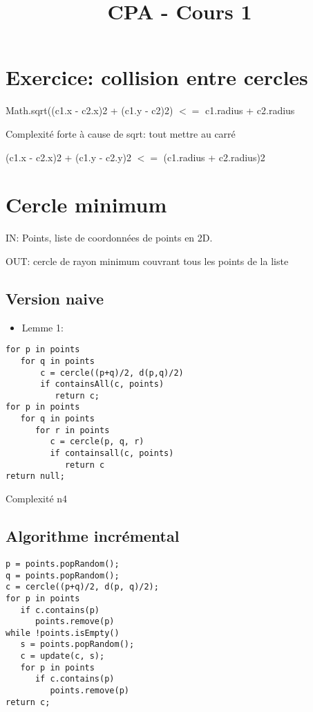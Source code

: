 \documentclass{article}
\begin{document}
\title{CPA - Cours 1}
\maketitle
\section{Exercice: collision entre cercles}
Math.sqrt((c1.x - c2.x)2 + (c1.y - c2)2) $<=$ c1.radius + c2.radius

Complexité forte à cause de sqrt: tout mettre au carré

(c1.x - c2.x)2 + (c1.y - c2.y)2 $<=$ (c1.radius + c2.radius)2
\section{Cercle minimum}
IN: Points, liste de coordonnées de points en 2D.

OUT: cercle de rayon minimum couvrant tous les points de la liste

\subsection{Version naive}
\begin{itemize}
\item Lemme 1: 
\end{itemize}
\begin{verbatim}
for p in points
   for q in points
       c = cercle((p+q)/2, d(p,q)/2)
       if containsAll(c, points)
          return c;
for p in points
   for q in points
      for r in points
         c = cercle(p, q, r)
         if containsall(c, points)
            return c
return null;
\end{verbatim}
Complexité n4
\subsection{Algorithme incrémental}
\begin{verbatim}
p = points.popRandom();
q = points.popRandom();
c = cercle((p+q)/2, d(p, q)/2);
for p in points
   if c.contains(p)
      points.remove(p)
while !points.isEmpty()
   s = points.popRandom();
   c = update(c, s);
   for p in points
      if c.contains(p)
         points.remove(p)
return c;
\end{verbatim}
\end{document}
